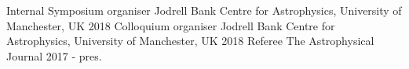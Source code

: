 \begin{cvpress}
   \cvpres
   {Internal Symposium organiser}
    {Jodrell Bank Centre for Astrophysics, University of Manchester, UK}
    {2018}
   \cvpres
   {Colloquium organiser}
    {Jodrell Bank Centre for Astrophysics, University of Manchester, UK}
    {2018}
    \cvpres
   {Referee}
    {The Astrophysical Journal}
    {2017 - pres.}
\end{cvpress}


